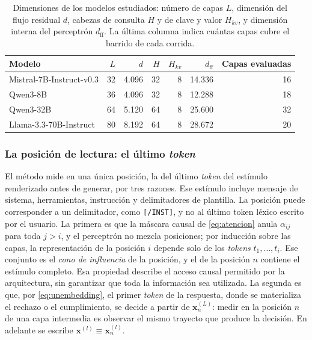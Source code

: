 \begin{table}[htbp]
\centering
\small
\setlength{\tabcolsep}{5pt}
\begin{tabular}{@{}lrrrrrr@{}}
\toprule
\textbf{Modelo} & $L$ & $d$ & $H$ & $H_{kv}$ & $d_{\text{ff}}$ & \textbf{Capas evaluadas} \\
\midrule
Mistral-7B-Instruct-v0.3 & 32 & 4.096 & 32 & 8 & 14.336 & 16 \\
Qwen3-8B                 & 36 & 4.096 & 32 & 8 & 12.288 & 18 \\
Qwen3-32B                & 64 & 5.120 & 64 & 8 & 25.600 & 32 \\
Llama-3.3-70B-Instruct   & 80 & 8.192 & 64 & 8 & 28.672 & 20 \\
\bottomrule
\end{tabular}
\caption{Dimensiones de los modelos estudiados: número de capas $L$, dimensión del flujo residual $d$, cabezas de consulta $H$ y de clave y valor $H_{kv}$, y dimensión interna del perceptrón $d_{\text{ff}}$. La última columna indica cuántas capas cubre el barrido de cada corrida.}
\label{tab:modelos}
\end{table}

\subsubsection*{La posición de lectura: el último \textit{token}}

El método mide en una única posición, la del último \textit{token} del estímulo renderizado antes de generar, por tres razones. Ese estímulo incluye mensaje de sistema, herramientas, instrucción y delimitadores de plantilla. La posición puede corresponder a un delimitador, como \texttt{[/INST]}, y no al último token léxico escrito por el usuario. La primera es que la máscara causal de \eqref{eq:atencion} anula $\alpha_{ij}$ para toda $j > i$, y el perceptrón no mezcla posiciones; por inducción sobre las capas, la representación de la posición $i$ depende solo de los \textit{tokens} $t_1, \dots, t_i$. Ese conjunto es el \emph{cono de influencia} de la posición, y el de la posición $n$ contiene el estímulo completo. Esa propiedad describe el acceso causal permitido por la arquitectura, sin garantizar que toda la información sea utilizada. La segunda es que, por \eqref{eq:unembedding}, el primer \textit{token} de la respuesta, donde se materializa el rechazo o el cumplimiento, se decide a partir de $\bm{x}_n^{(L)}$: medir en la posición $n$ de una capa intermedia es observar el mismo trayecto que produce la decisión. En adelante se escribe $\bm{x}^{(l)} \equiv \bm{x}_n^{(l)}$.

